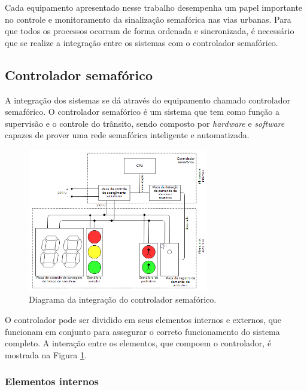 Cada equipamento apresentado nesse trabalho desempenha um papel importante no controle e monitoramento da sinalização semafórica nas vias urbanas. Para que todos os processos ocorram de forma ordenada e sincronizada, é necessário que se realize a integração entre os sistemas com o controlador semafórico. 

\subsection{Controlador semafórico}

A integração dos sistemas se dá através do equipamento chamado controlador semafórico. O controlador semafórico é um sistema que tem como função a supervisão e o controle do trânsito, sendo composto por \textit{hardware} e \textit{software} capazes de prover uma rede semafórica inteligente e automatizada.

\begin{figure}[ht]
    \begin{center}
    \includegraphics[width=0.7\textwidth]{figuras/diagrama_controlador.PNG}
    \end{center}
    \caption[Controlador semafórico]{Diagrama da integração do controlador semafórico.}
    \label{controlador}
\end{figure}

O controlador pode ser dividido em seus elementos internos e externos, que funcionam em conjunto para assegurar o correto funcionamento do sistema completo. A interação entre os elementos, que compoem o controlador, é mostrada na Figura \ref{controlador}. 

\subsubsection{Elementos internos}


